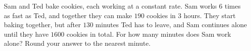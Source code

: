Sam and Ted bake cookies, each working at a constant rate. Sam works $6$ times as fast as Ted, and together they can make $190$ cookies in $3$ hours. They start baking together, but after $130$ minutes Ted has to leave, and Sam continues alone until they have $1600$ cookies in total. For how many minutes does Sam work alone? Round your answer to the nearest minute.
